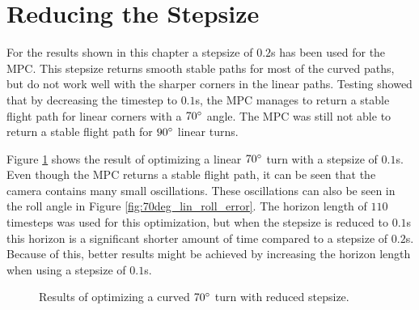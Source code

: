 \section{Reducing the Stepsize}
\label{sec:reducing_stepsize}

For the results shown in this chapter a stepsize of $0.2$s has been used for the MPC. This stepsize returns smooth stable paths for most of the curved paths, but do not work well with the sharper corners in the linear paths. Testing showed that by decreasing the timestep to $0.1$s, the MPC manages to return a stable flight path for linear corners with a $70\degree$ angle. The MPC was still not able to return a stable flight path for $90\degree$ linear turns.

Figure \ref{fig:70deg_lin_error} shows the result of optimizing a linear $70\degree$ turn with a stepsize of $0.1$s. Even though the MPC returns a stable flight path, it can be seen that the camera contains many small oscillations. These oscillations can also be seen in the roll angle in Figure \ref{fig:70deg_lin_roll_error}. The horizon length of $110$ timesteps was used for this optimization, but when the stepsize is reduced to $0.1$s this horizon is a significant shorter amount of time compared to a stepsize of $0.2$s. Because of this, better results might be achieved by increasing the horizon length when using a stepsize of $0.1$s.

\begin{figure}
	\caption{Results of optimizing a curved $70\degree$ turn with reduced stepsize.}
	\label{fig:70deg_lin_error}
\end{figure}